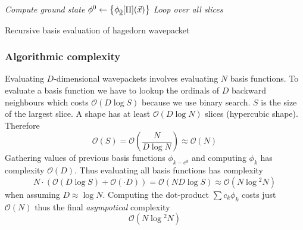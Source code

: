 \documentclass{article}
\begin{document}
\begin{algorithm}[H]
  \emph{Compute ground state}\;
  \(\phi^0 \gets \left\{ \phi_{\underline{0}}[\Pi](\vec{x}) \right\} \)\;
  \emph{Loop over all slices}\;
  \caption{Recursive basis evaluation of hagedorn wavepacket}
\end{algorithm}

\subsubsection{Algorithmic complexity} \label{sec:hawp_eval_runtime_complexity}
Evaluating \(D\)-dimensional wavepackets involves evaluating \(N\) basis functions.
To evaluate a basis function we have to lookup the ordinals of \(D\)
backward neighbours which costs \(\mathcal{O}(D \log{}S)\) because we use binary search.
\(S\) is the size of the largest slice. A shape has at least \(\mathcal{O}(D\log{}N)\)
slices (hypercubic shape). Therefore
\[
  \mathcal{O}(S)=\mathcal{O}(\frac{N}{D\log{}N}) \approx \mathcal{O}(N)
\]
Gathering values of previous basis functions \(\phi_{k-e^d}\) and computing \(\phi_k\)
has complexity \(\mathcal{O}(D)\).
Thus evaluating all basis functions has complexity
\[
  N \cdot \left(\mathcal{O}(D\log{}S) + \mathcal{O}(\cdot D)\right) =
  \mathcal{O}(ND\log{}S) \approx
  \mathcal{O}(N\log{}^2 N)
\]
when assuming \(D \approx \log{}N\).
Computing the dot-product \(\sum c_k\phi_k\) costs just \(\mathcal{O}(N)\)
thus the final \emph{asympotical} complexity
\begin{equation}
  \label{eq:hawp_eval_complexity}
  \mathcal{O}(N\log{}^2N)
\end{equation}
\end{document}
